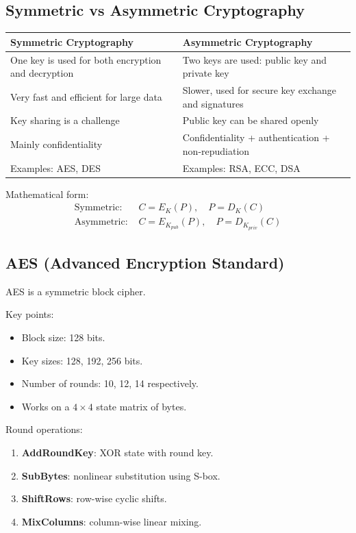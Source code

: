 \documentclass[12pt,a4paper]{article}
\begin{document}
\subsection{Symmetric vs Asymmetric Cryptography}
\begin{longtable}{p{}p{}}
\toprule
\textbf{Symmetric Cryptography} & \textbf{Asymmetric Cryptography} \\
\midrule
One key is used for both encryption and decryption & Two keys are used: public key and private key \\
Very fast and efficient for large data & Slower, used for secure key exchange and signatures \\
Key sharing is a challenge & Public key can be shared openly \\
Mainly confidentiality & Confidentiality + authentication + non-repudiation \\
Examples: AES, DES & Examples: RSA, ECC, DSA \\
\bottomrule
\end{longtable}

Mathematical form:
\begin{align}
\text{Symmetric: } & C = E_K(P), \quad P = D_K(C) \\
\text{Asymmetric: } & C = E_{K_{pub}}(P), \quad P = D_{K_{priv}}(C)
\end{align}

\subsection{AES (Advanced Encryption Standard)}
AES is a symmetric block cipher.

Key points:
\begin{itemize}
\item Block size: 128 bits.
\item Key sizes: 128, 192, 256 bits.
\item Number of rounds: 10, 12, 14 respectively.
\item Works on a \(4 \times 4\) state matrix of bytes.
\end{itemize}

Round operations:
\begin{enumerate}
\item \textbf{AddRoundKey}: XOR state with round key.
\item \textbf{SubBytes}: nonlinear substitution using S-box.
\item \textbf{ShiftRows}: row-wise cyclic shifts.
\item \textbf{MixColumns}: column-wise linear mixing.
\end{enumerate}
\end{document}
